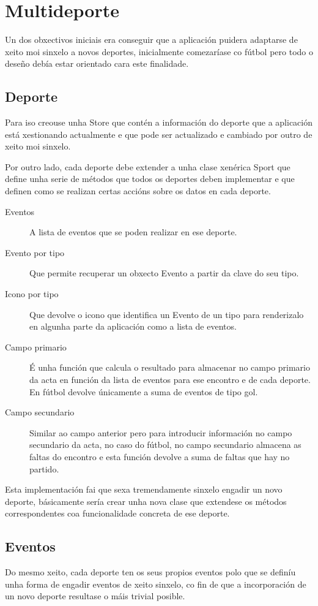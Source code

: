   \section{Multideporte}
  Un dos obxectivos iniciais era conseguir que a aplicación puidera adaptarse 
de xeito moi sinxelo a novos deportes, inicialmente comezaríase co fútbol pero 
todo o deseño debía estar orientado cara este finalidade.

  \subsection{Deporte}
  Para iso creouse unha Store que contén a información do deporte que a 
aplicación está xestionando actualmente e que pode ser actualizado e cambiado 
por outro de xeito moi sinxelo.

  Por outro lado, cada deporte debe extender a unha clase xenérica Sport que 
define unha serie de métodos que todos os deportes deben implementar e que 
definen como se realizan certas accións sobre os datos en cada deporte.

  \begin{description}
   \item [Eventos] A lista de eventos que se poden realizar en ese deporte.
   \item [Evento por tipo] Que permite recuperar un obxecto Evento a partir da 
clave do seu tipo.
   \item [Icono por tipo] Que devolve o icono que identifica un Evento de un 
tipo para renderizalo en algunha parte da aplicación como a lista de eventos.
   \item [Campo primario] É unha función que calcula o resultado para 
almacenar no campo primario da acta en función da lista de eventos para ese 
encontro e de cada deporte. En fútbol devolve únicamente a suma de eventos de 
tipo gol.
   \item [Campo secundario] Similar ao campo anterior pero para introducir 
información no campo secundario da acta, no caso do fútbol, no campo secundario 
almacena as faltas do encontro e esta función devolve a suma de faltas que hay 
no partido.
  \end{description}

  Esta implementación fai que sexa tremendamente sinxelo engadir un novo 
deporte, básicamente sería crear unha nova clase que extendese os métodos 
correspondentes coa funcionalidade concreta de ese deporte.

  \subsection{Eventos}
  Do mesmo xeito, cada deporte ten os seus propios eventos polo que se definíu 
unha forma de engadir eventos de xeito sinxelo, co fin de que a incorporación 
de un novo deporte resultase o máis trivial posible.


